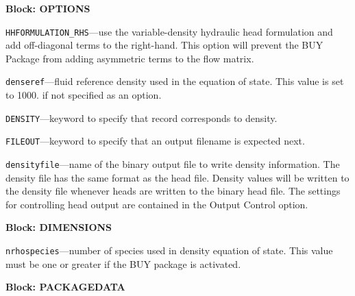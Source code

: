 
\item \textbf{Block: OPTIONS}

\begin{description}
\item \texttt{HHFORMULATION\_RHS}---use the variable-density hydraulic head formulation and add off-diagonal terms to the right-hand.  This option will prevent the BUY Package from adding asymmetric terms to the flow matrix.

\item \texttt{denseref}---fluid reference density used in the equation of state.  This value is set to 1000. if not specified as an option.

\item \texttt{DENSITY}---keyword to specify that record corresponds to density.

\item \texttt{FILEOUT}---keyword to specify that an output filename is expected next.

\item \texttt{densityfile}---name of the binary output file to write density information.  The density file has the same format as the head file.  Density values will be written to the density file whenever heads are written to the binary head file.  The settings for controlling head output are contained in the Output Control option.

\end{description}
\item \textbf{Block: DIMENSIONS}

\begin{description}
\item \texttt{nrhospecies}---number of species used in density equation of state.  This value must be one or greater if the BUY package is activated.

\end{description}
\item \textbf{Block: PACKAGEDATA}

